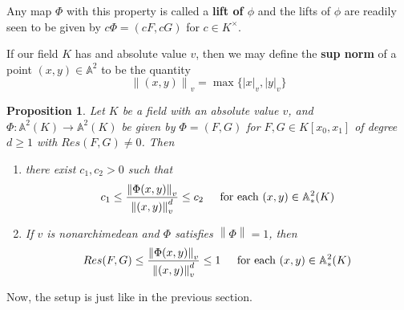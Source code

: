 \documentclass{amsart}
\newtheorem{prop}[thm]{Proposition}
\newcommand\norm[1]{\left\lVert#1\right\rVert}
\newcommand{\AF}{\mathbb{A}}
\newcommand{\AFAF}{\mathbb{A}^2}
\begin{document}
Any map $\Phi$ with this property is called a \textbf{lift of $\phi$} and the lifts of $\phi$ are readily seen to be given by $c \Phi = (cF,cG)$ for $c \in K^{\times}$.

If our field $K$ has and absolute value $v$, then we may define the \textbf{sup norm} of a point $(x,y) \in \AF^2$ to be the quantity $$\norm{(x,y)}_v = \max\{|x|_v,|y|_v\}$$

\begin{prop}

Let $K$ be a field with an absolute value $v$, and $\Phi:\AF^2(K) \rightarrow \AF^2(K)$ be given by $\Phi = (F,G)$ for $F,G \in K[x_0,x_1]$ of degree $d \geq 1$ with $Res(F,G) \neq 0$. Then 
\begin{enumerate}
\item there exist $c_1, c_2 >0$ such that $$c_1 \leq \frac{\norm{\Phi(x,y)}_v}{\norm{(x,y)}_v^d} \leq c_2 \hspace{4mm }\text{ for each } (x,y) \in \AFAF_*(K)$$
\item If $v$ is nonarchimedean and $\Phi$ satisfies $\norm{\Phi} = 1$, then $$Res(F,G) \leq \frac{\norm{\Phi(x,y)}_v}{\norm{(x,y)}_v^d} \leq 1 \hspace{4mm }\text{ for each } (x,y) \in \AFAF_*(K)$$ 
 
\end{enumerate}

\end{prop} 

Now, the setup is just like in the previous section.
\end{document}
